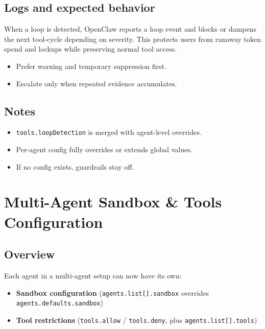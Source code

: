 \subsection{Logs and expected behavior}


When a loop is detected, OpenClaw reports a loop event and blocks or dampens the next tool-cycle depending on severity.
This protects users from runaway token spend and lockups while preserving normal tool access.

\begin{itemize}
  \item Prefer warning and temporary suppression first.
  \item Escalate only when repeated evidence accumulates.
\end{itemize}


\subsection{Notes}


\begin{itemize}
  \item \texttt{tools.loopDetection} is merged with agent-level overrides.
  \item Per-agent config fully overrides or extends global values.
  \item If no config exists, guardrails stay off.
\end{itemize}



\clearpage

\section{Multi-Agent Sandbox \& Tools Configuration}


\subsection{Overview}


Each agent in a multi-agent setup can now have its own:

\begin{itemize}
  \item \textbf{Sandbox configuration} (\texttt{agents.list[].sandbox} overrides \texttt{agents.defaults.sandbox})
  \item \textbf{Tool restrictions} (\texttt{tools.allow} / \texttt{tools.deny}, plus \texttt{agents.list[].tools})
\end{itemize}


